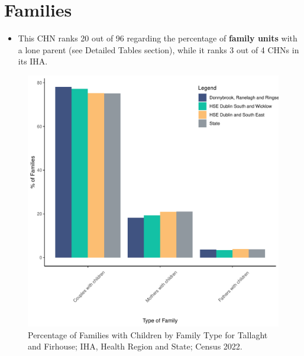 \documentclass{article}
\begin{document}
\section{Families}\label{sect:Fam}
\begin{itemize}
\item This CHN ranks  20 out of 96 regarding the percentage of \textbf{family units} with a lone parent (see Detailed Tables section), while it ranks   3 out of 4 CHNs in its IHA.
\end{itemize}
\begin{figure}[H]
	\centering
	\includegraphics[width = 150mm]{../figures/FamED.pdf}
	\caption{Percentage of Families with Children by Family Type for Tallaght and Firhouse; IHA, Health Region and State; Census 2022.}
	\label{fig:vbnv}
	\end{figure}
	
\end{document}
